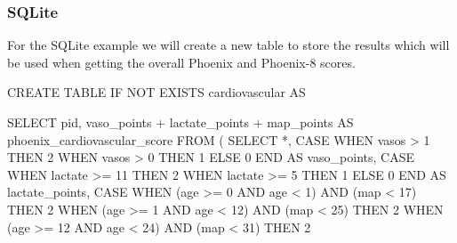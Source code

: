 \documentclass[
  letterpaper,
  DIV=11,
  numbers=noendperiod]{scrartcl}
\newenvironment{Shaded}{\begin{snugshade}}{\end{snugshade}}
\newcommand{\ControlFlowTok}[1]{\textcolor[rgb]{0.00,0.23,0.31}{#1}}
\newcommand{\DecValTok}[1]{\textcolor[rgb]{0.68,0.00,0.00}{#1}}
\newcommand{\KeywordTok}[1]{\textcolor[rgb]{0.00,0.23,0.31}{#1}}
\newcommand{\NormalTok}[1]{\textcolor[rgb]{0.00,0.23,0.31}{#1}}
\newcommand{\OperatorTok}[1]{\textcolor[rgb]{0.37,0.37,0.37}{#1}}
\begin{document}
\subsubsection{SQLite}\label{sqlite-1}

For the SQLite example we will create a new table to store the results
which will be used when getting the overall Phoenix and Phoenix-8
scores.

\begin{Shaded}
\begin{Highlighting}[]
\KeywordTok{CREATE} \KeywordTok{TABLE} \ControlFlowTok{IF} \KeywordTok{NOT} \KeywordTok{EXISTS}\NormalTok{ cardiovascular }\KeywordTok{AS}

\KeywordTok{SELECT}
\NormalTok{  pid,}
\NormalTok{  vaso\_points }\OperatorTok{+}\NormalTok{ lactate\_points }\OperatorTok{+}\NormalTok{ map\_points }\KeywordTok{AS}\NormalTok{ phoenix\_cardiovascular\_score}
\KeywordTok{FROM}
\NormalTok{(}
  \KeywordTok{SELECT} \OperatorTok{*}\NormalTok{,}
    \ControlFlowTok{CASE} \ControlFlowTok{WHEN}\NormalTok{ vasos }\OperatorTok{\textgreater{}} \DecValTok{1} \ControlFlowTok{THEN} \DecValTok{2}
         \ControlFlowTok{WHEN}\NormalTok{ vasos }\OperatorTok{\textgreater{}} \DecValTok{0} \ControlFlowTok{THEN} \DecValTok{1}
         \ControlFlowTok{ELSE} \DecValTok{0} \ControlFlowTok{END} \KeywordTok{AS}\NormalTok{ vaso\_points,}
    \ControlFlowTok{CASE} \ControlFlowTok{WHEN}\NormalTok{ lactate }\OperatorTok{\textgreater{}=} \DecValTok{11} \ControlFlowTok{THEN} \DecValTok{2}
         \ControlFlowTok{WHEN}\NormalTok{ lactate }\OperatorTok{\textgreater{}=}  \DecValTok{5} \ControlFlowTok{THEN} \DecValTok{1}
         \ControlFlowTok{ELSE} \DecValTok{0} \ControlFlowTok{END} \KeywordTok{AS}\NormalTok{ lactate\_points,}
    \ControlFlowTok{CASE} \ControlFlowTok{WHEN}\NormalTok{ (age }\OperatorTok{\textgreater{}=}   \DecValTok{0} \KeywordTok{AND}\NormalTok{ age }\OperatorTok{\textless{}}    \DecValTok{1}\NormalTok{) }\KeywordTok{AND}\NormalTok{ (map }\OperatorTok{\textless{}} \DecValTok{17}\NormalTok{) }\ControlFlowTok{THEN} \DecValTok{2}
         \ControlFlowTok{WHEN}\NormalTok{ (age }\OperatorTok{\textgreater{}=}   \DecValTok{1} \KeywordTok{AND}\NormalTok{ age }\OperatorTok{\textless{}}   \DecValTok{12}\NormalTok{) }\KeywordTok{AND}\NormalTok{ (map }\OperatorTok{\textless{}} \DecValTok{25}\NormalTok{) }\ControlFlowTok{THEN} \DecValTok{2}
         \ControlFlowTok{WHEN}\NormalTok{ (age }\OperatorTok{\textgreater{}=}  \DecValTok{12} \KeywordTok{AND}\NormalTok{ age }\OperatorTok{\textless{}}   \DecValTok{24}\NormalTok{) }\KeywordTok{AND}\NormalTok{ (map }\OperatorTok{\textless{}} \DecValTok{31}\NormalTok{) }\ControlFlowTok{THEN} \DecValTok{2}

\end{Highlighting}
\end{Shaded}
\end{document}

